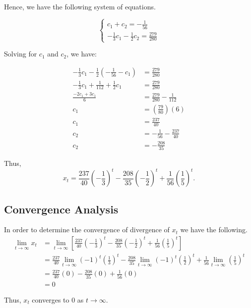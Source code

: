 \documentclass [a4paper]{article}
\begin{document}
Hence, we have the following system of equations.

\[
\begin{cases}
  c_1 + c_2 = -\frac{1}{56} \\
  -\frac{1}{3}c_1 -\frac{1}{2}c_2 = \frac{279}{280}
\end{cases}
\]

Solving for \(c_1\) and \(c_2\), we have:

\begin{align*}
-\frac{1}{3}c_1 -\frac{1}{2}\left(-\frac{1}{56} -c_1\right) &= \frac{279}{280} \\
-\frac{1}{3}c_1 + \frac{1}{112} + \frac{1}{2}c_1 &= \frac{279}{280} \\
\frac{-2c_1 + 3c_1}{6} &= \frac{279}{280} - \frac{1}{112} \\
c_1 &= \left(\frac{79}{80}\right)(6) \\
c_1 &= \frac{237}{40}\\
c_2 &= -\frac{1}{56} - \frac{237}{40}\\
c_2 &= -\frac{208}{35}
\end{align*}

Thus,
\[
x_t = \frac{237}{40}\left(-\frac{1}{3}\right)^t -\frac{208}{35}\left(-\frac{1}{2}\right)^t + \frac{1}{56}\left(\frac{1}{5}\right)^t.
\]

\subsection{Convergence Analysis}
In order to determine the convergence of divergence of \(x_t\) we have the following. 
\begin{align*}
\lim_{t \to \infty} x_t &= \lim_{t \to \infty}\left[\frac{237}{40}\left(-\frac{1}{3}\right)^t - \frac{208}{35}\left(-\frac{1}{2}\right)^t + \frac{1}{56}\left(\frac{1}{5}\right)^t\right] \\
&= \frac{237}{40}\lim_{t \to \infty}(-1)^t \left(\frac{1}{3}\right)^t -\frac{208}{35}\lim_{t \to \infty} (-1)^t\left(\frac{1}{2}\right)^t + \frac{1}{56}\lim_{t \to \infty}\left(\frac{1}{5}\right)^t\\
&= \frac{237}{40} (0) - \frac{208}{35} (0) + \frac{1}{56} (0)\\
&= 0
\end{align*}

Thus, \(x_t\) converges to 0 as \(t \to \infty\).
\newpage
\end{document}
